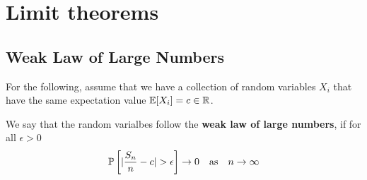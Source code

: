 \section{Limit theorems}

\subsection{Weak Law of Large Numbers}
For the following, assume that we have a collection of random variables $X_i$ that have the same expectation value $\mathbb{E}[X_i] = c \in \mathbb{R}$.

\begin{dfn}[]
We say that the random varialbes follow the \textbf{weak law of large numbers}, if for all $\epsilon > 0$
\begin{align*}
  \mathbb{P}\left[
    \vert\frac{S_n}{n} - c\vert > \epsilon
  \right]
  \to 0 \quad \text{as} \quad n \to  \infty
\end{align*}
\end{dfn}



